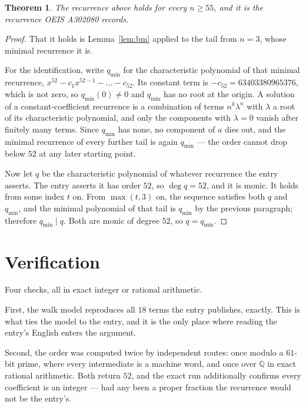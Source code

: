 \documentclass[11pt,a4paper]{article}
\theoremstyle{plain}
\newtheorem{theorem}{Theorem}
\theoremstyle{definition}
\begin{document}
\begin{theorem}
The recurrence above holds for every $n\ge55$, and it is the recurrence OEIS A302080 records.
\end{theorem}

\begin{proof}
That it holds is Lemma~\ref{lem:bm} applied to the tail from $n=3$, whose minimal
recurrence it is.

For the identification, write $q_{\min}$ for the characteristic polynomial of that minimal
recurrence, $x^{52}-c_1x^{52-1}-\dots-c_{52}$. Its constant term is
$-c_{52}=63403380965376$, which is not zero, so $q_{\min}(0)\neq0$ and $q_{\min}$ has no
root at the origin. A solution of a constant-coefficient recurrence is a combination of terms
$n^{k}\lambda^{n}$ with $\lambda$ a root of its characteristic polynomial, and only the
components with $\lambda=0$ vanish after finitely many terms. Since $q_{\min}$ has none, no
component of $a$ dies out, and the minimal recurrence of every further tail is again
$q_{\min}$ --- the order cannot drop below $52$ at any later starting point.

Now let $q$ be the characteristic polynomial of whatever recurrence the entry asserts. The
entry asserts it has order $52$, so $\deg q=52$, and it is monic. It holds from some
index $t$ on. From $\max(t,3)$ on, the sequence satisfies both $q$ and $q_{\min}$, and
the minimal polynomial of that tail is $q_{\min}$ by the previous paragraph; therefore
$q_{\min}\mid q$. Both are monic of degree $52$, so $q=q_{\min}$.
\end{proof}

\section{Verification}

Four checks, all in exact integer or rational arithmetic.

First, the walk model reproduces all $18$ terms the entry publishes, exactly. This is
what ties the model to the entry, and it is the only place where reading the entry's English
enters the argument.

Second, the order was computed twice by independent routes: once modulo a $61$-bit prime, where
every intermediate is a machine word, and once over $\mathbb{Q}$ in exact rational arithmetic.
Both return $52$, and the exact run additionally confirms every coefficient is an integer
--- had any been a proper fraction the recurrence would not be the entry's.
\end{document}

